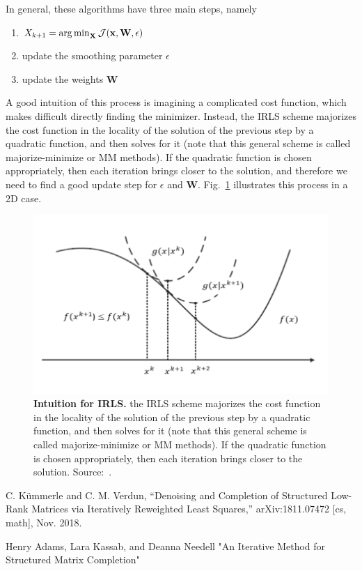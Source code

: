 In general, these algorithms have three main steps, namely
\begin{enumerate}
    \item $X_{k+1} = \operatorname*{arg\,min}_\mathbf{X} \mathcal{J}(\mathbf{x}, \mathbf{W}, \epsilon)$
    \item update the smoothing parameter $\epsilon$
    \item update the weights $\mathbf{W}$
\end{enumerate}
A good intuition of this process is imagining a complicated cost function, which makes difficult directly finding the minimizer. Instead, the IRLS scheme majorizes the cost function in the locality of the solution of the previous step by a quadratic function, and then solves for it (note that this general scheme is called majorize-minimize or MM methods). If the quadratic function is chosen appropriately, then each iteration brings closer to the solution, and therefore we need to find a good update step for $\epsilon$ and $\mathbf{W}$. Fig.~\ref{fig:mm-intuition} illustrates this process in a 2D case.

\begin{figure}
    \centering
    \includegraphics[width=0.5\linewidth]{images/mm-methods.png}
    \caption{\textbf{Intuition for IRLS.} the IRLS scheme majorizes the cost function in the locality of the solution of the previous step by a quadratic function, and then solves for it (note that this general scheme is called majorize-minimize or MM methods). If the quadratic function is chosen appropriately, then each iteration brings closer to the solution. Source:~\cite{noauthor_novel_nodate}.}
    \label{fig:mm-intuition}
\end{figure}

C. Kümmerle and C. M. Verdun, “Denoising and Completion of Structured Low-Rank Matrices via Iteratively Reweighted Least Squares,” arXiv:1811.07472 [cs, math], Nov. 2018.

Henry Adams, Lara Kassab, and Deanna Needell "An Iterative Method for Structured Matrix Completion"

\clearpage %